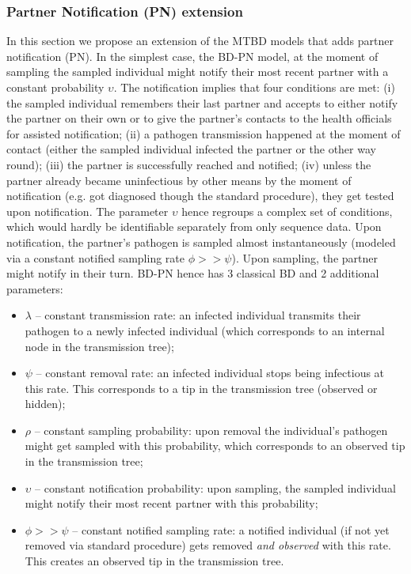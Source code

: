 \documentclass[10pt,letterpaper]{article}
\begin{document}
\subsubsection*{Partner Notification (PN) extension}

In this section we propose an %
extension of the MTBD models that adds partner notification (PN).  In the simplest case, the BD-PN model, at the moment of sampling the sampled individual might notify their most recent partner with a constant probability $\upsilon$. The notification implies that four conditions are met: (i) the sampled individual remembers their last partner and accepts to either notify the partner on their own or to give the partner's contacts to the health officials for assisted notification; (ii) a pathogen transmission happened at the moment of contact (either the sampled individual infected the partner or the other way round); (iii) the partner is successfully reached and notified; (iv) unless the partner already became uninfectious by other means by the moment of notification (e.g. got diagnosed though the standard procedure), they get tested upon notification. The parameter $\upsilon$ hence regroups a complex set of conditions, which would hardly be identifiable separately from only sequence data. Upon notification, the partner's pathogen is sampled almost instantaneously (modeled via a constant notified sampling rate $\phi >> \psi$). Upon sampling, the partner might notify in their turn. BD-PN hence has 3 classical BD and 2 additional parameters:
\begin{itemize}
 \item $\lambda$ -- constant transmission rate: an infected individual transmits their pathogen to a newly infected individual (which corresponds to an internal node in the transmission tree);
 \item $\psi$ -- constant removal rate: an infected individual stops being infectious at this rate. This corresponds to a tip in the transmission tree (observed or hidden);
 \item $\rho$ -- constant sampling probability: upon removal the individual's pathogen might get sampled with this probability, which corresponds to an observed tip in the transmission tree;
 \item $\upsilon$ -- constant notification probability: upon sampling, the sampled individual might notify their most recent partner with this probability;
 \item $\phi >> \psi$ -- constant notified sampling rate: a notified individual (if not yet removed via standard procedure) gets removed \textit{and observed} with this rate. This creates an observed tip in the transmission tree. 
\end{itemize}
\end{document}
